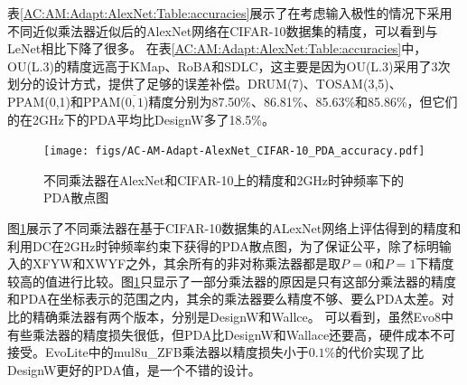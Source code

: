 \begin{table}
    \renewcommand{\arraystretch}{1.3}
    \setlength\tabcolsep{3.76pt}
    \caption{采用不同近似乘法器近似后的AlexNet网络在CIFAR-10数据集的精度}
    \label{AC:AM:Adapt:AlexNet:Table:accuracies}
    \centering
\end{table}


表\ref{AC:AM:Adapt:AlexNet:Table:accuracies}展示了在考虑输入极性的情况下采用不同近似乘法器近似后的AlexNet网络在CIFAR-10数据集的精度，可以看到与LeNet相比下降了很多。
在表\ref{AC:AM:Adapt:AlexNet:Table:accuracies}中，OU(L.3)的精度远高于KMap、RoBA和SDLC，这主要是因为OU(L.3)采用了3次划分的设计方式，提供了足够的误差补偿。DRUM(7)、TOSAM(3,5)、PPAM(0,1)和PPAM($\overline{0,1}$)精度分别为87.50\%、86.81\%、85.63\%和85.86\%，但它们的在2GHz下的PDA平均比DesignW多了18.5\%。

\begin{figure}[!htb]
    \centering
    \texttt{[image: figs/AC-AM-Adapt-AlexNet\_CIFAR-10\_PDA\_accuracy.pdf]}
    \caption{不同乘法器在AlexNet和CIFAR-10上的精度和2GHz时钟频率下的PDA散点图}
    \label{AC:AM:Adapt:Fig:AlexNet_CIFAR-10_PDA_accuracy}
\end{figure}

图\ref{AC:AM:Adapt:Fig:AlexNet_CIFAR-10_PDA_accuracy}展示了不同乘法器在基于CIFAR-10\cite{DNN:CIFAR-10}数据集的ALexNet网络\cite{DNN:AlexNet}上评估得到的精度和利用DC在2GHz时钟频率约束下获得的PDA散点图，为了保证公平，除了标明输入的XFYW和XWYF之外，其余所有的非对称乘法器都是取$P=0$和$P=1$下精度较高的值进行比较。图\ref{AC:AM:Adapt:Fig:AlexNet_CIFAR-10_PDA_accuracy}只显示了一部分乘法器的原因是只有这部分乘法器的精度和PDA在坐标表示的范围之内，其余的乘法器要么精度不够、要么PDA太差。对比的精确乘法器有两个版本，分别是DesignW和Wallce。
可以看到，虽然Evo8中有些乘法器的精度损失很低，但PDA比DesignW和Wallace还要高，硬件成本不可接受。EvoLite中的mul8u\_ZFB乘法器以精度损失小于$0.1\%$的代价实现了比DesignW更好的PDA值，是一个不错的设计。

